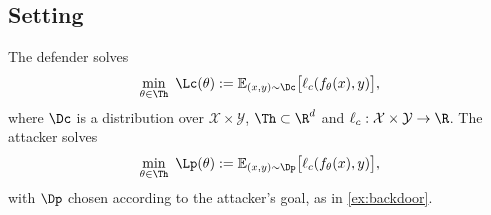 %



\subsection{Setting}
\label{sec:setting}

The defender solves
\begin{equation}
\min_{\theta\in\Th}\ \Lc(\theta):=\mathbb{E}_{(x,y)\sim\Dc}\big[\ell_c(f_\theta(x),y)\big],
\end{equation}
where $\Dc$ is a distribution over $\mathcal X\times\mathcal Y$, $\Th\subset\R^d$ and $\ell_c:\mathcal X\times\mathcal Y\to\R$. The attacker solves
\begin{equation}
\min_{\theta\in\Th}\ \Lp(\theta):=\mathbb{E}_{(x,y)\sim\Dp}\big[\ell_c(f_\theta(x),y)\big],
\end{equation}
with $\Dp$ chosen according to the attacker's goal, as in \cref{ex:backdoor}.

